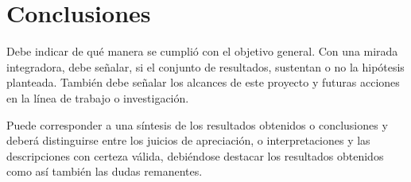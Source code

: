 \chapter{Conclusiones}

Debe indicar de qué manera se cumplió con el objetivo general. Con una mirada integradora, debe señalar, si el conjunto de resultados, sustentan o no la hipótesis planteada. También debe señalar los alcances de este proyecto y futuras acciones en la línea de trabajo o investigación.\par
Puede corresponder a una síntesis de los resultados obtenidos o conclusiones y deberá distinguirse entre los juicios de apreciación, o interpretaciones y las descripciones con certeza válida, debiéndose destacar los resultados obtenidos como así también las dudas remanentes. 
